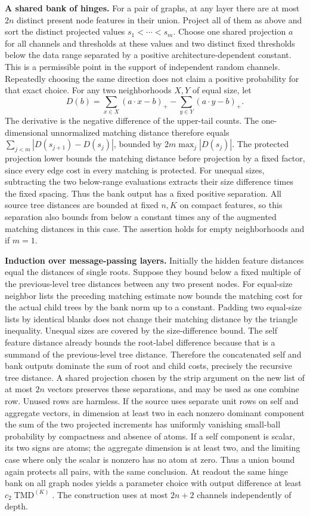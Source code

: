\documentclass[10pt]{article}
\begin{document}
\textbf{A shared bank of hinges.} For a pair of graphs, at any layer there are at most $2n$ distinct present node features in their union. Project all of them as above and sort the distinct projected values $s_1<\cdots<s_m$. Choose one shared projection $a$ for all channels and thresholds at these values and two distinct fixed thresholds below the data range separated by a positive architecture-dependent constant. This is a permissible point in the support of independent random channels. Repeatedly choosing the same direction does not claim a positive probability for that exact choice. For any two neighborhoods $X,Y$ of equal size, let
\[
 D(b)=\sum_{x\in X}(a\cdot x-b)_+-\sum_{y\in Y}(a\cdot y-b)_+.
\]
The derivative is the negative difference of the upper-tail counts. The one-dimensional unnormalized matching distance therefore equals $\sum_{j<m}|D(s_{j+1})-D(s_j)|$, bounded by $2m\max_j|D(s_j)|$. The protected projection lower bounds the matching distance before projection by a fixed factor, since every edge cost in every matching is protected. For unequal sizes, subtracting the two below-range evaluations extracts their size difference times the fixed spacing. Thus the bank output has a fixed positive separation. All source tree distances are bounded at fixed $n,K$ on compact features, so this separation also bounds from below a constant times any of the augmented matching distances in this case. The assertion holds for empty neighborhoods and if $m=1$.

\textbf{Induction over message-passing layers.} Initially the hidden feature distances equal the distances of single roots. Suppose they bound below a fixed multiple of the previous-level tree distances between any two present nodes. For equal-size neighbor lists the preceding matching estimate now bounds the matching cost for the actual child trees by the bank norm up to a constant. Padding two equal-size lists by identical blanks does not change their matching distance by the triangle inequality. Unequal sizes are covered by the size-difference bound. The self feature distance already bounds the root-label difference because that is a summand of the previous-level tree distance. Therefore the concatenated self and bank outputs dominate the sum of root and child costs, precisely the recursive tree distance. A shared projection chosen by the strip argument on the new list of at most $2n$ vectors preserves these separations, and may be used as one combine row. Unused rows are harmless. If the source uses separate unit rows on self and aggregate vectors, in dimension at least two in each nonzero dominant component the sum of the two projected increments has uniformly vanishing small-ball probability by compactness and absence of atoms. If a self component is scalar, its two signs are atoms; the aggregate dimension is at least two, and the limiting case where only the scalar is nonzero has no atom at zero. Thus a union bound again protects all pairs, with the same conclusion. At readout the same hinge bank on all graph nodes yields a parameter choice with output difference at least $c_2\operatorname{TMD}^{(K)}$. The construction uses at most $2n+2$ channels independently of depth.
\end{document}

